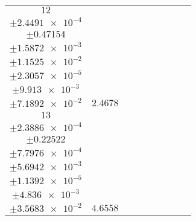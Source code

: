 \documentclass[8pt]{article}
\begin{document}
\begin{longtable}[l]{c c c c c c c c c}
$\num{12}$ & \begin{tabular}[c]{@{}c@{}}$\num{3.0088e-2}$ \\ $\pm\num{2.4491e-4}$\end{tabular} & \begin{tabular}[c]{@{}c@{}}$\num{-0.24889}$ \\ $\pm\num{0.47154}$\end{tabular} & \begin{tabular}[c]{@{}c@{}}$\num{0.90968}$ \\ $\pm\num{1.5872e-3}$\end{tabular} & \begin{tabular}[c]{@{}c@{}}$\num{2.1443e+3}$ \\ $\pm\num{1.1525e-2}$\end{tabular} & \begin{tabular}[c]{@{}c@{}}$\num{4.2899}$ \\ $\pm\num{2.3057e-5}$\end{tabular} & \begin{tabular}[c]{@{}c@{}}$\num{1.1685}$ \\ $\pm\num{9.913e-3}$\end{tabular} & \begin{tabular}[c]{@{}c@{}}$\num{4.0459}$ \\ $\pm\num{7.1892e-2}$\end{tabular} & $\num{2.4678}$\\
$\num{13}$ & \begin{tabular}[c]{@{}c@{}}$\num{6.1229e-2}$ \\ $\pm\num{2.3886e-4}$\end{tabular} & \begin{tabular}[c]{@{}c@{}}$\num{-0.20647}$ \\ $\pm\num{0.22522}$\end{tabular} & \begin{tabular}[c]{@{}c@{}}$\num{4.2321}$ \\ $\pm\num{7.7976e-4}$\end{tabular} & \begin{tabular}[c]{@{}c@{}}$\num{2.1477e+3}$ \\ $\pm\num{5.6942e-3}$\end{tabular} & \begin{tabular}[c]{@{}c@{}}$\num{4.2965}$ \\ $\pm\num{1.1392e-5}$\end{tabular} & \begin{tabular}[c]{@{}c@{}}$\num{1.1823}$ \\ $\pm\num{4.836e-3}$\end{tabular} & \begin{tabular}[c]{@{}c@{}}$\num{4.2039}$ \\ $\pm\num{3.5683e-2}$\end{tabular} & $\num{4.6558}$\\

\end{longtable}
\end{document}
